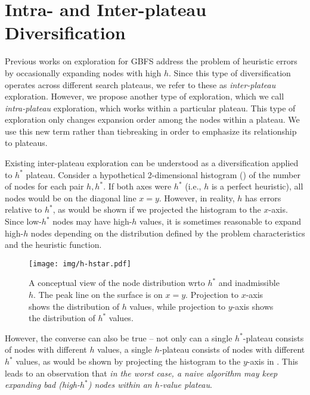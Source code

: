 \section{Intra- and Inter-plateau Diversification}
\label{sec:intra-inter}

Previous works on exploration for GBFS  address the problem of heuristic errors
by occasionally expanding nodes with high $h$.
Since this type of diversification operates  across different search plateaus,
we refer to these as \emph{inter-plateau} exploration.
However, we propose another type of exploration,
which we call \emph{intra-plateau} exploration, which works within a particular plateau.
This type of exploration only changes expansion order among the nodes within a plateau.
We use this new term rather than tiebreaking in order to emphasize its relationship to plateaus.

Existing inter-plateau exploration can be understood as a diversification applied to $h^*$ plateau.
Consider a hypothetical  2-dimensional histogram () of the number of nodes for each pair $h,h^*$.
If both axes were $h^*$ (i.e., $h$ is a perfect heuristic), all nodes would be on the diagonal line $x=y$.
However, in reality, $h$ has errors relative to  $h^*$, as would be shown if we projected the histogram to the $x$-axis.
Since low-$h^*$ nodes may have high-$h$ values,
it is sometimes reasonable to expand
high-$h$ nodes depending on the distribution defined by the problem characteristics and the heuristic function.

\begin{figure}[bt]
 \centering
 \texttt{[image: img/h-hstar.pdf]}
 \caption{A conceptual view of the node distribution wrto $h^*$ and inadmissible $h$.
 The peak line on the surface is on $x=y$.
 Projection to $x$-axis shows the distribution of $h$ values, while 
 projection to $y$-axis shows the distribution of $h^*$ values.
 }
 \label{fig:h-hstar}
\end{figure}

However, the converse can also be true --
not only can a single $h^*$-plateau consists of nodes with different $h$ values,
a single $h$-plateau consists of nodes with different $h^*$ values,
as would be shown by projecting the histogram  to the $y$-axis in .
This leads to an observation that
\emph{in the worst case, a naive algorithm may keep expanding bad (high-$h^*$) nodes within an $h$-value plateau}.

